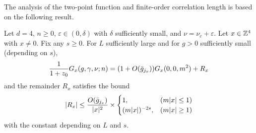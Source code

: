The analysis of the two-point function and finite-order correlation length is
based on the following result.

\begin{prop}
\label{prop:R}
Let $d=4$, $n \ge 0$, $\varepsilon \in (0,\delta)$ with $\delta$ sufficiently small,
and $\nu = \nu_c + \varepsilon$.
Let $x \in {\mathbb Z}^4$ with $x \neq 0$.
Fix any $s \geq 0$.
For $L$ sufficiently large and for $g > 0$ sufficiently small (depending on $s$),
\begin{equation}
\label{e:Gab-to-sum-Rqj}
\frac{1}{1+z_0} G_x(g, \gamma, \nu; n) = (1 + O(\bar{g}_{j_x})) G_x(0, 0, m^2) + R_x
\end{equation}
and the remainder $R_x$ satisfies the bound
\begin{equation}
\label{e:Rab-bound}
|R_{x}|
	\le
\frac{O(\bar{g}_{j_{x}}) }{|x|^2}
	\times
\begin{cases}
1,				& (m|x|\le 1) \\
(m|x|)^{-2s},	& (m|x|\ge 1)
\end{cases}
\end{equation}
with the  constant depending on $L$ and $s$.
\end{prop}

